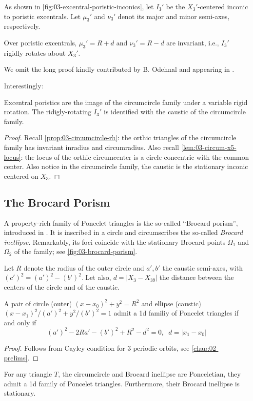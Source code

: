 As shown in \cref{fig:03-excentral-poristic-inconics}, let $I_3'$ be the $X_3'$-centered inconic to poristic excentrals. Let $\mu_3'$ and $\nu_3'$ denot its major and minor semi-axes, respectively.

\begin{proposition}
Over poristic excentrals,  $\mu_3'=R+d$ and $\nu_3'=R-d$ are invariant, i.e., $I_3'$ rigidly rotates about $X_3'$.
\label{prop:03-inconic-x3p}
\end{proposition}

We omit the long proof kindly contributed by B. Odehnal and appearing in \cite[Appendix C]{garcia2020-similarity-I}.

Interestingly:

\begin{theorem}
Excentral poristics are the image of the circumcircle family under a variable rigid rotation. The ridigly-rotating $I_3'$ is identified with the caustic of the circumcircle family.
\end{theorem} 

\begin{proof}
Recall \cref{prop:03-circumcircle-rh}: the orthic triangles of the circumcircle family has invariant inradius and circumradius. Also recall \cref{lem:03-circum-x5-locus}: the locus of the orthic circumcenter is a circle concentric with the common center. Also notice in the circumcircle family, the caustic is the stationary inconic centered on $X_3$.
\end{proof}

\subsection{The Brocard Porism}
 
A property-rich family of Poncelet triangles is the so-called ``Brocard porism'', introduced in  \cite{bradley2007-brocard,shail1996-brocard, bradley2011-brocard}. It is inscribed in a circle and circumscribes the so-called {\em Brocard inellipse}. Remarkably, its foci coincide with the stationary Brocard points $\Omega_1$ and $\Omega_2$ of the family; see \cref{fig:03-brocard-porism}.

Let $R$ denote the radius of the outer circle and $a',b'$ the caustic semi-axes, with $(c')^2=(a')^2-(b')^2$. Let also, $d=|X_{3}-X_{39}|$ the distance between the centers of the circle and of the caustic.

\begin{proposition}
A pair of circle (outer) $(x-x_0)^2+y^2=R^2$ and ellipse (caustic) $(x-x_1)^2/(a')^2+y^2/(b')^2=1$ admit a 1d familiy of Poncelet triangles if and only if 
\[(a')^2  - 2 R a'- (b')^2 +  R^2-d^2=0,\;\; d=|x_1-x_0| \]
\end{proposition}
\begin{proof}
  Follows from Cayley condition for 3-periodic orbits, see \cref{chap:02-prelims}.
\end{proof}
\begin{proposition}
For any triangle $T$, the circumcircle and Brocard inellipse are Ponceletian, they admit a 1d family of Poncelet triangles. Furthermore, their Brocard inellipse is stationary.
\end{proposition}

